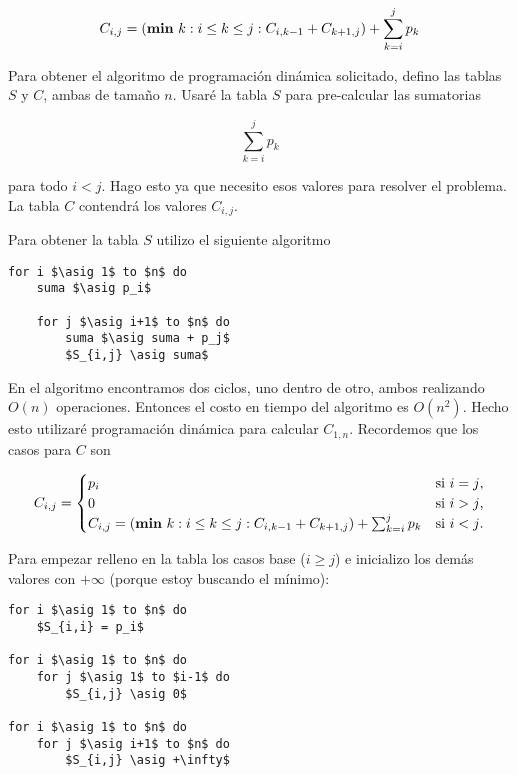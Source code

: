\documentclass{article}
\newcommand{\asig}{\ensuremath{\leftarrow}}
\begin{document}
$$
C_{i,j} = (\text{{\bf min} } k : i \leq k \leq j : C_{i,k-1} + C_{k+1,j}) + \sum_{k=i}^j p_k
$$

Para obtener el algoritmo de programación dinámica solicitado,
defino las tablas $S$ y $C$, ambas de tamaño $n$. Usaré la tabla $S$ para pre-calcular las sumatorias

$$
\sum_{k=i}^j p_k
$$

para todo $i < j$. Hago esto ya que necesito esos valores para resolver el problema. La tabla $C$ contendrá
los valores $C_{i,j}$.

Para obtener la tabla $S$ utilizo el siguiente algoritmo

\begin{lstlisting}[caption={Cálculo de la tabla S},label=alg:tablaS]
for i $\asig 1$ to $n$ do
    suma $\asig p_i$

    for j $\asig i+1$ to $n$ do
        suma $\asig suma + p_j$
        $S_{i,j} \asig suma$
\end{lstlisting}

En el algoritmo encontramos dos ciclos, uno dentro de otro, ambos realizando $O(n)$ operaciones. Entonces
el costo en tiempo del algoritmo es $O(n^2)$. Hecho esto utilizaré programación dinámica para calcular
$C_{1,n}$. Recordemos que los casos para $C$ son

\begin{equation*}
C_{i,j} = 
\begin{cases}
p_i & \text{si $i=j$,} \\
0 &\text{si $i>j$,} \\
C_{i,j} = (\text{{\bf min} } k : i \leq k \leq j : C_{i,k-1} + C_{k+1,j}) + \sum_{k=i}^j p_k &\text{si $i<j$.} \\
\end{cases}
\end{equation*}

Para empezar relleno en la tabla los casos base ($i \geq j$) e inicializo los demás valores
con $+\infty$ (porque estoy buscando el mínimo):

\begin{lstlisting}[caption={Inicialización de casos base de la tabla C},label=alg:tablaC_base]
for i $\asig 1$ to $n$ do
    $S_{i,i} = p_i$

for i $\asig 1$ to $n$ do
    for j $\asig 1$ to $i-1$ do
        $S_{i,j} \asig 0$

for i $\asig 1$ to $n$ do
    for j $\asig i+1$ to $n$ do
        $S_{i,j} \asig +\infty$
\end{lstlisting}
\end{document}
